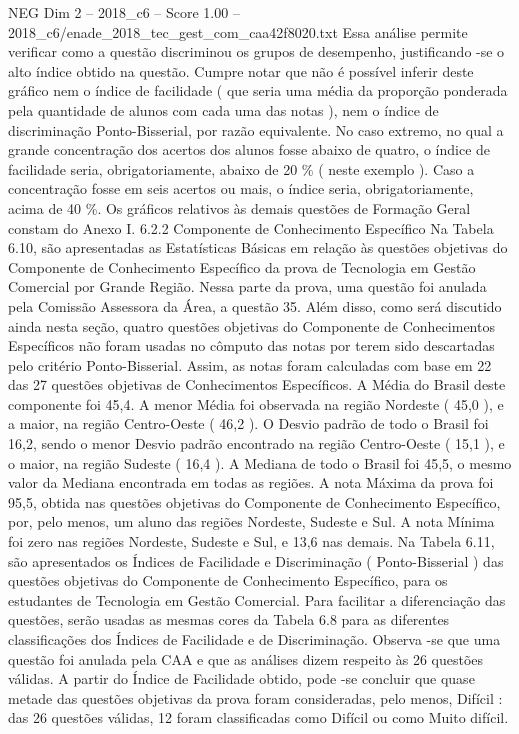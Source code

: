 \begin{textsample}{NEG Dim 2 – 2018\_c6 – Score 1.00 – 2018\_c6/enade\_2018\_tec\_gest\_com\_caa42f8020.txt}
Essa análise permite verificar como a questão discriminou os grupos de desempenho, justificando -se o alto índice obtido na questão.
Cumpre notar que não é possível inferir deste gráfico nem o índice de facilidade ( que seria uma média da proporção ponderada pela quantidade de alunos com cada uma das notas ), nem o índice de discriminação Ponto-Bisserial, por razão equivalente.
No caso extremo, no qual a grande concentração dos acertos dos alunos fosse abaixo de quatro, o índice de facilidade seria, obrigatoriamente, abaixo de 20 \% ( neste exemplo ).
Caso a concentração fosse em seis acertos ou mais, o índice seria, obrigatoriamente, acima de 40 \%.
Os gráficos relativos às demais questões de Formação Geral constam do Anexo I. 6.2.2 Componente de Conhecimento Específico Na Tabela 6.10, são apresentadas as Estatísticas Básicas em relação às questões objetivas do Componente de Conhecimento Específico da prova de Tecnologia em Gestão Comercial por Grande Região.
Nessa parte da prova, uma questão foi anulada pela Comissão Assessora da Área, a questão 35.
Além disso, como será discutido ainda nesta seção, quatro questões objetivas do Componente de Conhecimentos Específicos não foram usadas no cômputo das notas por terem sido descartadas pelo critério Ponto-Bisserial.
Assim, as notas foram calculadas com base em 22 das 27 questões objetivas de Conhecimentos Específicos.
A Média do Brasil deste componente foi 45,4.
A menor Média foi observada na região Nordeste ( 45,0 ), e a maior, na região Centro-Oeste ( 46,2 ).
O Desvio padrão de todo o Brasil foi 16,2, sendo o menor Desvio padrão encontrado na região Centro-Oeste ( 15,1 ), e o maior, na região Sudeste ( 16,4 ).
A Mediana de todo o Brasil foi 45,5, o mesmo valor da Mediana encontrada em todas as regiões.
A nota Máxima da prova foi 95,5, obtida nas questões objetivas do Componente de Conhecimento Específico, por, pelo menos, um aluno das regiões Nordeste, Sudeste e Sul.
A nota Mínima foi zero nas regiões Nordeste, Sudeste e Sul, e 13,6 nas demais.
Na Tabela 6.11, são apresentados os Índices de Facilidade e Discriminação ( Ponto-Bisserial ) das questões objetivas do Componente de Conhecimento Específico, para os estudantes de Tecnologia em Gestão Comercial.
Para facilitar a diferenciação das questões, serão usadas as mesmas cores da Tabela 6.8 para as diferentes classificações dos Índices de Facilidade e de Discriminação.
Observa -se que uma questão foi anulada pela CAA e que as análises dizem respeito às 26 questões válidas.
A partir do Índice de Facilidade obtido, pode -se concluir que quase metade das questões objetivas da prova foram consideradas, pelo menos, Difícil : das 26 questões válidas, 12 foram classificadas como Difícil ou como Muito difícil.

\end{textsample}
